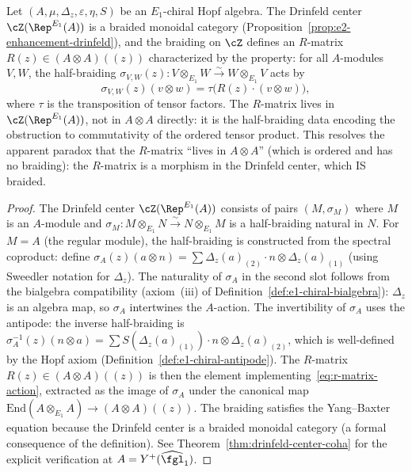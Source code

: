 \begin{proposition}
\label{prop:r-matrix-from-drinfeld}
Let $(A, \mu, \Delta_z, \varepsilon, \eta, S)$ be an $E_1$-chiral Hopf
algebra. The Drinfeld center
$\cZ(\Rep^{E_1}(A))$ is a braided monoidal category
(Proposition~\ref{prop:e2-enhancement-drinfeld}), and the braiding
on $\cZ$ defines an $R$-matrix
$R(z) \in (A \otimes A)((z))$
characterized by the property: for all $A$-modules $V, W$, the
half-braiding $\sigma_{V,W}(z) \colon V \otimes_{E_1} W
\xrightarrow{\sim} W \otimes_{E_1} V$ acts by
\begin{equation}\label{eq:r-matrix-action}
 \sigma_{V,W}(z)(v \otimes w)
 = \tau\bigl(R(z) \cdot (v \otimes w)\bigr),
\end{equation}
where $\tau$ is the transposition of tensor factors.
The $R$-matrix lives in $\cZ(\Rep^{E_1}(A))$, not in $A \otimes A$
directly: it is the half-braiding data encoding the obstruction to
commutativity of the ordered tensor product. This resolves the
apparent paradox that the $R$-matrix ``lives in $A \otimes A$''
(which is ordered and has no braiding): the $R$-matrix is a morphism
in the Drinfeld center, which IS braided.
\end{proposition}

\begin{proof}
The Drinfeld center $\cZ(\Rep^{E_1}(A))$ consists of pairs $(M, \sigma_M)$
where $M$ is an $A$-module and $\sigma_M \colon M \otimes_{E_1} N
\xrightarrow{\sim} N \otimes_{E_1} M$ is a half-braiding natural in $N$.
For $M = A$ (the regular module), the half-braiding is constructed from
the spectral coproduct: define
$\sigma_A(z)(a \otimes n)
= \sum \Delta_z(a)_{(2)} \cdot n \otimes \Delta_z(a)_{(1)}$
(using Sweedler notation for $\Delta_z$). The naturality of $\sigma_A$
in the second slot follows from the bialgebra compatibility (axiom~(iii)
of Definition~\ref{def:e1-chiral-bialgebra}): $\Delta_z$ is an algebra
map, so $\sigma_A$ intertwines the $A$-action. The invertibility of
$\sigma_A$ uses the antipode: the inverse half-braiding is
$\sigma_A^{-1}(z)(n \otimes a)
= \sum S(\Delta_z(a)_{(1)}) \cdot n \otimes \Delta_z(a)_{(2)}$,
which is well-defined by the Hopf axiom
(Definition~\ref{def:e1-chiral-antipode}).
The $R$-matrix $R(z) \in (A \otimes A)((z))$ is then the element
implementing~\eqref{eq:r-matrix-action}, extracted as the image of
$\sigma_A$ under the canonical map
$\mathrm{End}(A \otimes_{E_1} A) \to (A \otimes A)((z))$.
The braiding satisfies the Yang--Baxter equation because the Drinfeld
center is a braided monoidal category (a formal consequence of the
definition). See Theorem~\ref{thm:drinfeld-center-coha} for the
explicit verification at $A = Y^+(\widehat{\fgl}_1)$.
\end{proof}

